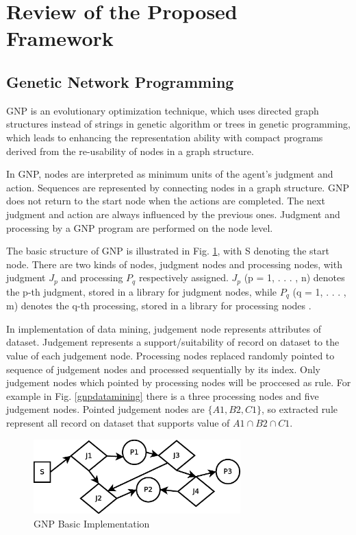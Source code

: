 \documentclass[fleqn,10pt,twocolumn]{SICE14}
\begin{document}
\section{Review of the Proposed Framework}

\subsection{Genetic Network Programming}
GNP is an evolutionary optimization technique, which uses directed graph structures instead of strings in genetic algorithm or trees in genetic programming, which leads to enhancing the representation ability with compact programs derived from the re-usability of nodes in a graph structure.

In GNP, nodes are interpreted as minimum units of the agent’s judgment and action. Sequences are represented by connecting nodes in a graph structure. GNP does not return to the start node when the actions are completed. The next judgment and action are always influenced by the previous ones. Judgment and processing by a GNP program are performed on the node level. 

The basic structure of GNP is illustrated in Fig. \ref{gnpbasic}, with S denoting the start node. There are two kinds of nodes, judgment nodes and processing nodes, with judgment $J_{p}$ and processing $P_{q}$ respectively assigned. $J_{p}$ (p = 1, . . . , n) denotes the p-th judgment, stored in a library for judgment nodes, while $P_{q}$ (q = 1, . . . , m) denotes the q-th processing, stored in a library for processing nodes \cite{gnp1, gnp2}. 

In implementation of data mining, judgement node represents attributes of dataset. Judgement represents a support/suitability of record on dataset to the value of each judgement node. Processing nodes replaced randomly pointed to sequence of judgement nodes and processed sequentially by its index. Only judgement nodes which pointed by processing nodes will be proccesed as rule. For example in Fig. \ref{gnpdatamining} there is a three processing nodes and five judgement nodes. Pointed judgement nodes are $\{A1,B2,C1\}$, so extracted rule represent all record on dataset that supports value of $A1 \cap B2 \cap C1$.

\begin{figure}[tb]
\begin{center}
\includegraphics[width=8cm]{gnpbasic}
\caption{\label{gnpbasic} GNP Basic Implementation}
\end{center}
\end{figure}
\end{document}
